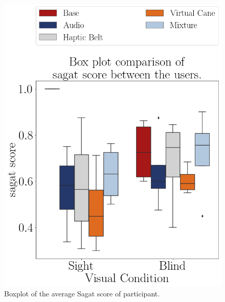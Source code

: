 \begin{figure}[!htb]
    \begin{minipage}{.45\linewidth}
        \centering
        \includegraphics[width = \linewidth]{Resultados/Sagat/Figuras/png/boxplot_sagat_scene.png}
        \caption{Boxplot of the average Sagat score of participant.}
        \label{fig:boxplot_sagat_scene}
    \end{minipage}
    \begin{minipage}{.1\linewidth}
        \hfill
    \end{minipage}
    \begin{minipage}{.45\linewidth}
        

\end{minipage}
\end{figure}

